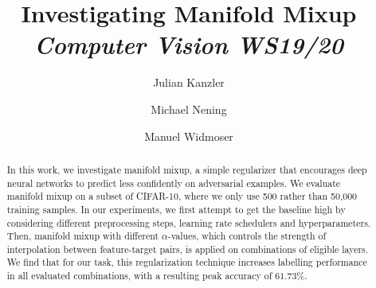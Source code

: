 \documentclass[11pt]{article}
\title{\vspace*{-3em}\huge \textbf{Investigating Manifold Mixup}\\[0.25em] \large \textit{Computer Vision WS19/20}\\[0.5em]}
\date{}
\author{
	Julian Kanzler \and
	Michael Nening \and
	Manuel Widmoser
}
\begin{document}
\maketitle

\medskip

\begin{abstract}
	\noindent In this work, we investigate manifold mixup, a simple regularizer that encourages deep neural networks to predict less confidently on adversarial examples. 
    We evaluate manifold mixup on a subset of CIFAR-10, where we only use 500 rather than 50,000 training samples.
    In our experiments, we first attempt to get the baseline high by considering different preprocessing steps, learning rate schedulers and hyperparameters.
    Then, manifold mixup with different $\alpha$-values, which controls the strength of interpolation between feature-target pairs, is applied on combinations of eligible layers.
    We find that for our task, this regularization technique increases labelling performance in all evaluated combinations, with a resulting peak accuracy of $61.73\%$.
\end{abstract}







{}

\end{document}
